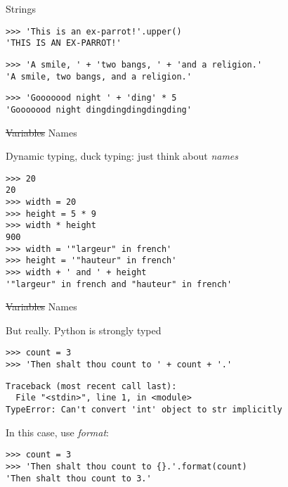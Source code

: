 \documentclass[ignorenonframetext,]{beamer}
\begin{document}
\begin{frame}[fragile]{Strings}
    \begin{tcolorbox}
    \begin{verbatim}
>>> 'This is an ex-parrot!'.upper()
'THIS IS AN EX-PARROT!'
    \end{verbatim}
    \end{tcolorbox}

    \pause
    \begin{tcolorbox}
    \begin{verbatim}
>>> 'A smile, ' + 'two bangs, ' + 'and a religion.'
'A smile, two bangs, and a religion.'
    \end{verbatim}
    \end{tcolorbox}

    \pause
    \begin{tcolorbox}
    \begin{verbatim}
>>> 'Gooooood night ' + 'ding' * 5
'Gooooood night dingdingdingdingding'
    \end{verbatim}
    \end{tcolorbox}
\end{frame}

\begin{frame}[fragile]{\st{Variables} Names}

    Dynamic typing, duck typing: just think about \emph{names}

    \begin{tcolorbox}
    \begin{verbatim}
>>> 20
20
>>> width = 20
>>> height = 5 * 9
>>> width * height
900
>>> width = '"largeur" in french'
>>> height = '"hauteur" in french'
>>> width + ' and ' + height
'"largeur" in french and "hauteur" in french'
    \end{verbatim}
    \end{tcolorbox}
\end{frame}

\begin{frame}[fragile]{\st{Variables} Names}

    But really. Python is strongly typed

    \begin{tcolorbox}
    \begin{verbatim}
>>> count = 3
>>> 'Then shalt thou count to ' + count + '.'
    \end{verbatim}
    \begin{verbatim}
Traceback (most recent call last):
  File "<stdin>", line 1, in <module>
TypeError: Can't convert 'int' object to str implicitly
    \end{verbatim}
    \end{tcolorbox}

    \pause
    In this case, use \emph{format}:
    \begin{tcolorbox}
    \begin{verbatim}
>>> count = 3
>>> 'Then shalt thou count to {}.'.format(count)
'Then shalt thou count to 3.'
    \end{verbatim}
    \end{tcolorbox}
\end{frame}
\end{document}
